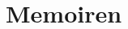 \section{Memoiren}
\begin{multicols*}{2}
\setlength\columnseprule{.4pt}
\hangindent=0.7cm 

\end{multicols*}
